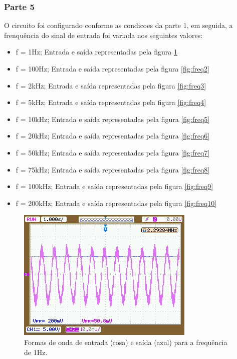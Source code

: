 \documentclass{abntex2}
\begin{document}
\subsubsection{Parte 5}

  O circuito foi configurado conforme as condicoes da parte 1, em seguida, a frenquência do sinal de entrada foi variada nos seguintes valores:
  \begin{itemize}
    \item f = 1Hz; Entrada e saída representadas pela figura \ref{fig:freq1}
    \item f = 100Hz; Entrada e saída representadas pela figura \ref{fig:freq2}
    \item f = 2kHz; Entrada e saída representadas pela figura \ref{fig:freq3}
    \item f = 5kHz; Entrada e saída representadas pela figura \ref{fig:freq4}
    \item f = 10kHz; Entrada e saída representadas pela figura \ref{fig:freq5}
    \item f = 20kHz; Entrada e saída representadas pela figura \ref{fig:freq6}
    \item f = 50kHz; Entrada e saída representadas pela figura \ref{fig:freq7}
    \item f = 75kHz; Entrada e saída representadas pela figura \ref{fig:freq8}
    \item f = 100kHz; Entrada e saída representadas pela figura \ref{fig:freq9}
    \item f = 200kHz; Entrada e saída representadas pela figura \ref{fig:freq10}
  \end{itemize}

  \begin{figure}[h]
    \centering
    \includegraphics[scale = 0.5]{freq_1.png}
    \caption{Formas de onda de entrada (rosa) e saída (azul) para a frequência de 1Hz.}
    \label{fig:freq1}
  \end{figure}
\end{document}
